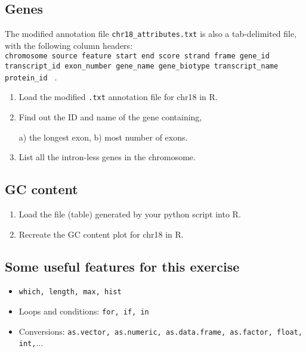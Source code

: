 \documentclass[a4paper,11pt]{article}
\begin{document}
\subsection{Genes}
The modified annotation file \texttt{chr18\_attributes.txt} is also a tab-delimited file, with the \indent following column headers: \\
\texttt {chromosome source feature start end score strand frame gene\_id transcript\_id exon\_number gene\_name gene\_biotype transcript\_name protein\_id } .
\begin{enumerate}
\normalsize
\item Load the modified \texttt{.txt} annotation file for chr18 in R.
\item Find out the ID and name of the gene containing,

 a) the longest exon, b) most number of exons.
\item List all the intron-less genes in the chromosome.
\end{enumerate}
\subsection{GC content}
\begin{enumerate}
\item Load the file (table) generated by your python script into R.
\item Recreate the GC content plot for chr18 in R.
\end{enumerate}

\subsection{Some useful features for this exercise}
\begin{itemize}
\item \texttt{which, length, max, hist}
\item Loops and conditions: \texttt{for, if, in}
\item Conversions: \texttt{as.vector, as.numeric, as.data.frame, as.factor, float, int,}...
\end{itemize}
\end{document}
